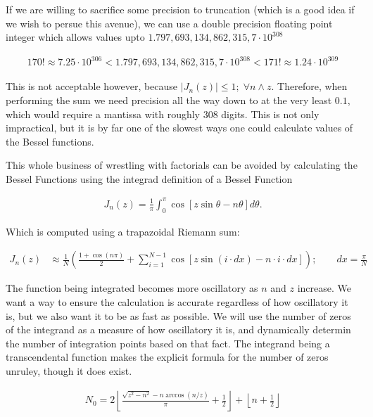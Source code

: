 \documentclass[onecolumn, groupedaddress, 10pt]{revtex4-1}
\begin{document}
If we are willing to sacrifice some precision to truncation (which is a good idea if we wish to persue this avenue), we can use a double precision floating point integer which allows values upto $1.797,693,134,862,315,7 \cdot 10^{308}$

\begin{align}
170! \approx 7.25 \cdot 10^{306}
< 1.797,693,134,862,315,7 \cdot 10^{308} <
171! \approx 1.24 \cdot 10^{309}
\end{align}

This is not acceptable however, because $\left| J_n(z) \right| \leq 1; \; \forall n \wedge z$.  Therefore, when performing the sum we need precision all the way down to at the very least $0.1$, which would require a mantissa with roughly $308$ digits.  This is not only impractical, but it is by far one of the slowest ways one could calculate values of the Bessel functions.  

This whole business of wrestling with factorials can be avoided by calculating the Bessel Functions using the integrad definition of a Bessel Function

\begin{align}
J_n (z) = \frac{1}{\pi} \int_{0}^{\pi} \cos \left[ z \sin \theta - n \theta \right] d \theta.
\end{align}

Which is computed using a trapazoidal Riemann sum:

\begin{align}
\label{eqn:numericalIntegralBessel}
J_n (z) &\approx \frac{1}{N} \left( \frac{1 + \cos (n \pi )}{2} + \sum_{i=1}^{N-1} \cos \left[ z \sin(i \cdot dx) - n \cdot i \cdot dx \right] \right);
\qquad dx = \frac{\pi}{N}
\end{align}

The function being integrated becomes more oscillatory as $n$ and $z$ increase.  We want a way to ensure the calculation is accurate regardless of how oscillatory it is, but we also want it to be as fast as possible.  We will use the number of zeros of the integrand as a measure of how oscillatory it is, and dynamically determin the number of integration points based on that fact.  The integrand being a transcendental function makes the explicit formula for the number of zeros unruley, though it does exist.

\begin{align}
N_0 = 2 \left\lfloor \frac{\sqrt{z^2-n^2} - n \arccos (n/z)}{\pi} + \frac{1}{2} \right\rfloor + \left\lfloor n + \frac{1}{2} \right\rfloor
\end{align}
\end{document}
